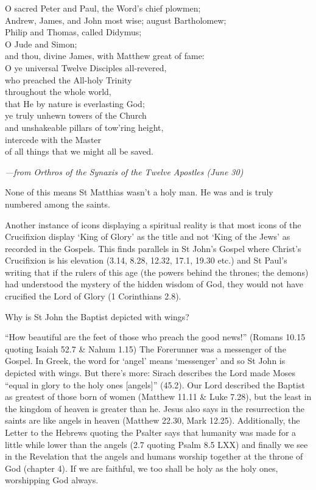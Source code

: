 \documentclass[
]{article}
\newcommand{\RL}[1]{\beginR #1\endR}
\begin{document}
O sacred Peter and Paul, the Word\RL{'}s chief plowmen;\\
Andrew, James, and John most wise; august Bartholomew;\\
Philip and Thomas, called Didymus;\\
O Jude and Simon;\\
and thou, divine James, with Matthew great of fame:\\
O ye universal Twelve Disciples all-revered,\\
who preached the All-holy Trinity\\
throughout the whole world,\\
that He by nature is everlasting God;\\
ye truly unhewn towers of the Church\\
and unshakeable pillars of tow\RL{'}ring height,\\
intercede with the Master\\
of all things that we might all be saved.

\emph{---from Orthros of the Synaxis of the Twelve Apostles (June 30)}

None of this means St Matthias wasn't a holy man. He was and is truly
numbered among the saints.

Another instance of icons displaying a spiritual reality is that most
icons of the Crucifixion display `King of Glory' as the title and not
`King of the Jews' as recorded in the Gospels. This finds parallels in
St John's Gospel where Christ's Crucifixion is his elevation (3.14,
8.28, 12.32, 17.1, 19.30 etc.) and St Paul's writing that if the rulers
of this age (the powers behind the thrones; the demons) had understood
the mystery of the hidden wisdom of God, they would not have crucified
the Lord of Glory (1 Corinthians 2.8).

Why is St John the Baptist depicted with wings?

``How beautiful are the feet of those who preach the good news!''
(Romans 10.15 quoting Isaiah 52.7 \& Nahum 1.15) The Forerunner was a
messenger of the Gospel. In Greek, the word for `angel' means
`messenger' and so St John is depicted with wings. But there's more:
Sirach describes the Lord made Moses ``equal in glory to the holy ones
{[}angels{]}'' (45.2). Our Lord described the Baptist as greatest of
those born of women (Matthew 11.11 \& Luke 7.28), but the least in the
kingdom of heaven is greater than he. Jesus also says in the
resurrection the saints are like angels in heaven (Matthew 22.30, Mark
12.25). Additionally, the Letter to the Hebrews quoting the Psalter says
that humanity was made for a little while lower than the angels (2.7
quoting Psalm 8.5 LXX) and finally we see in the Revelation that the
angels and humans worship together at the throne of God (chapter 4). If
we are faithful, we too shall be holy as the holy ones, worshipping God
always.
\end{document}
